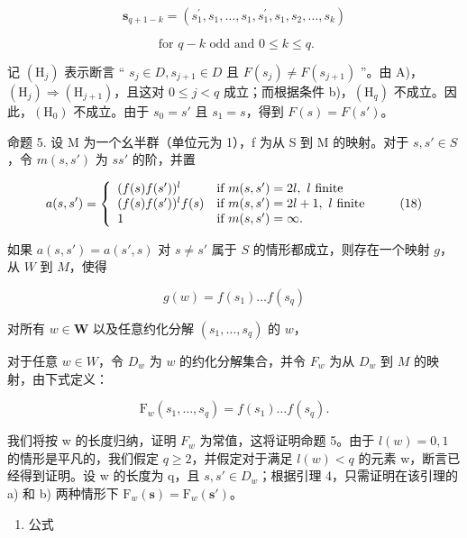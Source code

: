 \[
\mathbf {s} _ {q + 1 - k} = \left(s _ {1} ^ {\prime}, s _ {1}, \ldots , s _ {1}, s _ {1} ^ {\prime}, s _ {1}, s _ {2}, \ldots , s _ {k}\right)
\]

\[
\text { for   } q - k \text {   odd   and   } 0 \leqslant k \leqslant q.
\]

记 \((\mathrm{H}_{j})\) 表示断言 `` \(s_{j} \in D, s_{j+1} \in D\) 且 \(F(s_{j}) \neq F(s_{j+1})\) ''。由 A)，\((\mathrm{H}_{j}) \Longrightarrow (\mathrm{H}_{j+1})\)，且这对 \(0 \leqslant j < q\) 成立；而根据条件 b)，\((\mathrm{H}_{q})\) 不成立。因此，\((\mathrm{H}_{0})\) 不成立。由于 \(s_{0} = s'\) 且 \(s_{1} = s\)，得到 \(F(s) = F(s')\)。

命题 5. 设 M 为一个幺半群（单位元为 1），f 为从 S 到 M 的映射。对于 \(s, s' \in S\)，令 \(m(s, s')\) 为 \(ss'\) 的阶，并置

\[
a (s, s ^ {\prime}) = \left\{ \begin{array}{l l} (f (s) f (s ^ {\prime})) ^ {l} & \text {if } m(s,s^{\prime}) = 2l,\ l \text { finite} \\ (f (s) f (s ^ {\prime})) ^ {l} f (s) & \text {if } m(s,s^{\prime}) = 2l + 1,\ l \text { finite} \\ 1 & \text {if } m(s,s^{\prime}) = \infty . \end{array} \right.\tag{18}
\]

如果 \(a(s, s') = a(s', s)\) 对 \(s \neq s'\) 属于 \(S\) 的情形都成立，则存在一个映射 \(g\)，从 \(W\) 到 \(M\)，使得

\[
g (w) = f \left(s _ {1}\right) \dots f \left(s _ {q}\right)\tag{19}
\]

对所有 \(w \in \mathbf{W}\) 以及任意约化分解 \((s_1, \ldots, s_q)\) 的 \(w\)，

对于任意 \(w \in W\)，令 \(D_w\) 为 \(w\) 的约化分解集合，并令 \(F_w\) 为从 \(D_w\) 到 \(M\) 的映射，由下式定义：

\[
\mathrm{F} _ {w} (s _ {1}, \dots , s _ {q}) = f (s _ {1}) \dots f (s _ {q}).
\]

我们将按 w 的长度归纳，证明 \(F_{w}\) 为常值，这将证明命题 5。由于 \(l(w) = 0, 1\) 的情形是平凡的，我们假定 \(q \geqslant 2\)，并假定对于满足 \(l(w) < q\) 的元素 w，断言已经得到证明。设 w 的长度为 q，且 \(s, s' \in D_w\)；根据引理 4，只需证明在该引理的 a) 和 b) 两种情形下 \(\mathrm{F}_{w}(\mathbf{s}) = \mathrm{F}_{w}(\mathbf{s}')\)。

\begin{enumerate}
\def\labelenumi{\alph{enumi})}
\tightlist
\item
  公式
\end{enumerate}

